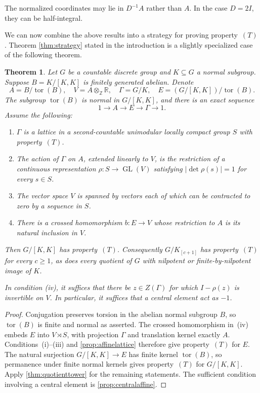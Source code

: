 \documentclass[11pt,a4paper]{article}
\newtheorem{theorem}{Theorem}[section]
\theoremstyle{definition}
\newcommand{\R}{\mathbb R}
\newcommand{\Z}{\mathbb Z}
\newcommand{\GL}{\operatorname{GL}}
\newcommand{\tor}{\operatorname{tor}}
\newcommand{\rt}{(T)}
\begin{document}
The normalized coordinates may lie in \(D^{-1}A\) rather
than \(A\). In the case \(D=2I\), they can be half-integral.

We can now combine the above results into a strategy for proving property~\(\rt\). 
Theorem \ref{thm:strategy} stated in the introduction is a slightly specialized case of the following theorem.
\begin{theorem}
\label{thm:generalcriterion}
Let \(G\) be a countable discrete group and \(K\subseteq G\)
a normal subgroup. Suppose \(B=K/[K,K]\) is finitely generated abelian.
Denote
\[
 A=B/\tor(B),\quad V=A\otimes_\Z\R,
 \quad\Gamma=G/K,
 \quad E=(G/[K,K])/\tor(B).
\]
The subgroup \(\tor(B)\) is normal in \(G/[K,K]\), and there is
an exact sequence \[1\to A\to E\to\Gamma\to1.\]
Assume the following:
\begin{enumerate}[label=\textup{(\roman*)}]
 \item \(\Gamma\) is a lattice in a second-countable
 unimodular locally compact group \(S\) with property~\(\rt\).
 \item The action of \(\Gamma\) on \(A\), extended linearly
 to \(V\), is the restriction of a continuous representation
 \(\rho:S\to\GL(V)\) satisfying
 \(|\det\rho(s)|=1\) for every \(s\in S\).
 \item The vector space \(V\) is spanned by vectors each of
 which can be contracted to zero by a sequence in \(S\).
 \item There is a crossed homomorphism \(b:E\to V\) whose
 restriction to \(A\) is its natural inclusion in \(V\).
\end{enumerate}
Then \(G/[K,K]\) has property~\(\rt\). Consequently
\(G/K_{[c+1]}\) has property~\(\rt\) for every \(c\ge1\),
as does every quotient of \(G\) with nilpotent or
finite-by-nilpotent image of \(K\).

In condition \textup{(iv)}, it suffices that there be
\(z\in Z(\Gamma)\) for which \(I-\rho(z)\) is invertible
on \(V\). In particular, it suffices that a central element
act as \(-1\).
\end{theorem}
\begin{proof}
Conjugation preserves torsion in the abelian normal subgroup
\(B\), so \(\tor(B)\) is finite and normal as asserted.
The crossed homomorphism in~(iv) embeds \(E\) into
\(V\rtimes S\), with projection \(\Gamma\) and translation
kernel exactly \(A\). Conditions~(i)--(iii) and
\cref{prop:affinelattice} therefore give property~\(\rt\)
for \(E\). The natural surjection
\(G/[K,K]\to E\) has finite kernel \(\tor(B)\),
so permanence under finite normal kernels gives property~\(\rt\) for
\(G/[K,K]\). Apply \cref{thm:quotienttower} for the remaining
statements. The sufficient condition involving a central element is
\cref{prop:centralaffine}.
\end{proof}
\end{document}
